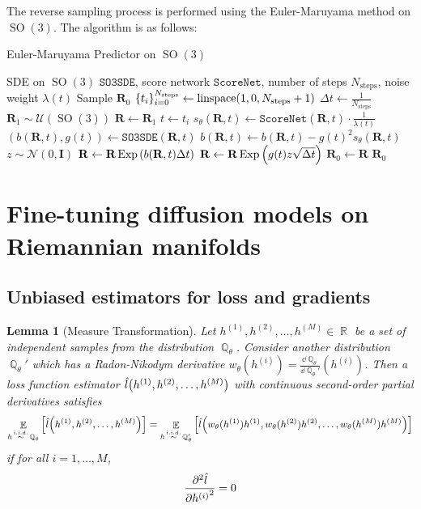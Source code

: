 \documentclass{article}
\theoremstyle{plain}
\newtheorem{lemma}[theorem]{Lemma}
\theoremstyle{definition}
\theoremstyle{remark}
\DeclareMathOperator{\SO}{SO}
\DeclareMathOperator{\Exp}{\operatorname{Exp}}
\DeclareMathOperator{\R}{\mathbb{R}}
\DeclareMathOperator{\Q}{\mathbb{Q}}
\DeclareMathOperator{\E}{\mathbb{E}}
\DeclareMathOperator{\iid}{\overset{\mathrm{i.i.d.}}{\sim}}
\begin{document}
The reverse sampling process is performed using the Euler-Maruyama method on $\SO(3)$. The algorithm is as follows:
\begin{algorithm}[!ht]
    \caption{Euler-Maruyama Predictor on $\SO(3)$}\label{alg:em_predictor_so3}
    \begin{algorithmic}[1]
        \REQUIRE SDE on $\SO(3)$ $\texttt{SO3SDE}$, score network $\texttt{ScoreNet}$, number of steps $N_\text{steps}$, noise weight $\lambda(t)$
        \ENSURE Sample $\mathbf{R}_0$
        \STATE $\qty{t_i}_{i=0}^{N_\text{steps}} \leftarrow \mathrm{linspace}(1, 0, N_\text{steps}+1)$
        \STATE $\Delta t \leftarrow \frac{1}{N_\text{steps}}$
        \STATE $\mathbf{R}_1 \sim \mathcal{U}(\SO(3))$
        \STATE $\mathbf{R} \leftarrow \mathbf{R}_1$
        \STATE $t \leftarrow t_i$
        \STATE $s_\theta(\mathbf{R}, t) \leftarrow \texttt{ScoreNet}(\mathbf{R}, t)\cdot \frac{1}{\lambda(t)}$
        \STATE $(b(\mathbf{R}, t),g(t)) \leftarrow \texttt{SO3SDE}(\mathbf{R}, t)$
        \STATE $b(\mathbf{R}, t) \leftarrow b(\mathbf{R}, t) - g(t)^2 s_\theta(\mathbf{R}, t)$
        \STATE $z \sim \mathcal{N}(0, \mathbf{I})$
        \STATE $\mathbf{R} \leftarrow \mathbf{R} \Exp\qty(b(\mathbf{R}, t)\Delta t)$
        \STATE $\mathbf{R} \leftarrow \mathbf{R} \Exp\qty(g(t)z\sqrt{\Delta t})$
        \ENDFOR
        \STATE $\mathbf{R}_0 \leftarrow \mathbf{R}$
        \RETURN $\mathbf{R}_0$
    \end{algorithmic}
\end{algorithm}

\section{Fine-tuning diffusion models on Riemannian manifolds}

\subsection{Unbiased estimators for loss and gradients}

\begin{lemma}[Measure Transformation]\label{lem:measure_transformation}
    Let $h^{(1)}, h^{(2)}, \dots, h^{(M)} \in \R$ be a set of independent samples from the distribution $\Q_\theta$. Consider another distribution $\Q_\theta'$ which has a Radon-Nikodym derivative $w_\theta(h^{(i)}) = \frac{\dd \Q_\theta}{\dd \Q_\theta'}(h^{(i)})$. Then a loss function estimator $\hat{l}\qty(h^{(1)}, h^{(2)}, \dots, h^{(M)})$ with continuous second-order partial derivatives satisfies
    \begin{equation}
        \label{eq:measure_transformation}
        \E_{h\iid \Q_\theta}\qty[\hat{l}\qty(h^{(1)}, h^{(2)}, \dots, h^{(M)})] = \E_{h\iid \Q_\theta'}\qty[\hat{l}\qty(w_\theta(h^{(1)})h^{(1)}, w_\theta(h^{(2)})h^{(2)}, \dots, w_\theta(h^{(M)})h^{(M)})]
    \end{equation}
    if for all $i=1,\dots,M$,
    \begin{equation}
        \pdv[2]{\hat{l}}{{h^{(i)}}} = 0
    \end{equation}
\end{lemma}
\end{document}
